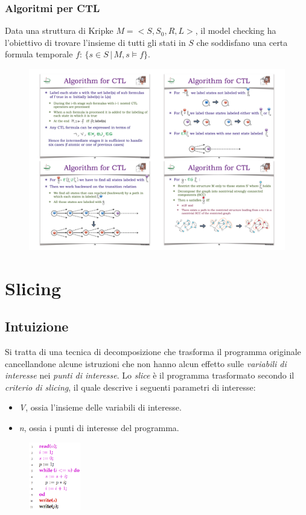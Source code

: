 \documentclass[a4paper,oneside,titlepage]{book}
\begin{document}
\subsection{Algoritmi per CTL}
Data una struttura di Kripke $M=<S,S_0,R,L>$, il model checking ha l'obiettivo di trovare l'insieme di tutti gli stati in $S$ che soddisfano una certa formula temporale $f$: $\{ s \in S \, | \, M,s \models f \}$.
\begin{figure}[htp]
	\centering
	\includegraphics[width=\textwidth, height=\textheight, keepaspectratio]{ctl8.png}
\end{figure}


\chapter{Slicing} %

\section{Intuizione}
Si tratta di una tecnica di decomposizione che trasforma il programma originale cancellandone alcune istruzioni che non hanno alcun effetto sulle \textit{variabili di interesse} nei \textit{punti di interesse}. Lo \textit{slice} è il programma trasformato secondo il \textit{criterio di slicing}, il quale descrive i seguenti parametri di interesse:
\begin{itemize}
    \item \textit{V}, ossia l'insieme delle variabili di interesse.
    \item \textit{n}, ossia i punti di interesse del programma.
\end{itemize}
\begin{figure}[htp]
	\centering
	\includegraphics[width=0.2\textwidth]{slicing1.png}
\end{figure}
\end{document}
